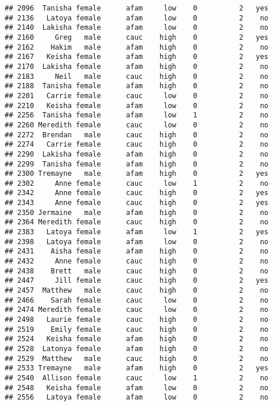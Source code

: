 \documentclass[
]{article}
\begin{document}
\begin{verbatim}
## 2096  Tanisha female      afam     low    0          2   yes
## 2136   Latoya female      afam     low    0          2    no
## 2140  Lakisha female      afam     low    0          2    no
## 2160     Greg   male      cauc    high    0          2   yes
## 2162    Hakim   male      afam    high    0          2    no
## 2167   Keisha female      afam    high    0          2   yes
## 2170  Lakisha female      afam    high    0          2    no
## 2183     Neil   male      cauc    high    0          2    no
## 2188  Tanisha female      afam    high    0          2    no
## 2201   Carrie female      cauc     low    0          2    no
## 2210   Keisha female      afam     low    0          2    no
## 2256  Tanisha female      afam     low    1          2    no
## 2260 Meredith female      cauc     low    0          2    no
## 2272  Brendan   male      cauc    high    0          2    no
## 2274   Carrie female      cauc    high    0          2    no
## 2290  Lakisha female      afam    high    0          2    no
## 2299  Tanisha female      afam    high    0          2    no
## 2300 Tremayne   male      afam    high    0          2   yes
## 2302     Anne female      cauc     low    1          2    no
## 2342     Anne female      cauc    high    0          2   yes
## 2343     Anne female      cauc    high    0          2   yes
## 2350 Jermaine   male      afam    high    0          2    no
## 2364 Meredith female      cauc    high    0          2    no
## 2383   Latoya female      afam     low    1          2   yes
## 2398   Latoya female      afam     low    0          2    no
## 2431    Aisha female      afam    high    0          2    no
## 2432     Anne female      cauc    high    0          2    no
## 2438    Brett   male      cauc    high    0          2    no
## 2447     Jill female      cauc    high    0          2   yes
## 2457  Matthew   male      cauc    high    0          2    no
## 2466    Sarah female      cauc     low    0          2    no
## 2474 Meredith female      cauc     low    0          2    no
## 2498   Laurie female      cauc    high    0          2    no
## 2519    Emily female      cauc    high    0          2    no
## 2524   Keisha female      afam    high    0          2    no
## 2528  Latonya female      afam    high    0          2    no
## 2529  Matthew   male      cauc    high    0          2    no
## 2533 Tremayne   male      afam    high    0          2   yes
## 2540  Allison female      cauc     low    1          2    no
## 2548   Keisha female      afam     low    0          2    no
## 2556   Latoya female      afam     low    0          2    no

\end{verbatim}
\end{document}
